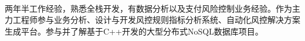 \documentclass[11pt, a4paper, UTF8]{awesome-cv}
\begin{document}
\makecvheader[R]

\makecvfooter
  {\ }
  {\ }
  {\thepage}




\begin{cvparagraph}
两年半工作经验，熟悉全栈开发，有数据分析以及支付风险控制业务经验。作为主力工程师参与业务分析、设计与开发风控规则指标分析系统、自动化风控解决方案生成平台。参与并了解基于C++开发的大型分布式NoSQL数据库项目。
\end{cvparagraph}
\end{document}
